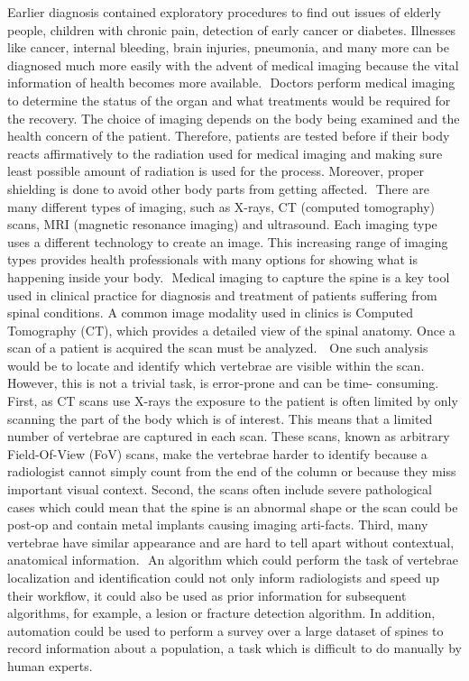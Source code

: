 Earlier diagnosis contained exploratory procedures to find out issues of elderly people, children with chronic pain, detection of early cancer or diabetes. Illnesses like cancer, internal bleeding, brain injuries, pneumonia, and many more can be diagnosed much more easily with the advent of medical imaging because the vital information of health becomes more available.  Doctors perform medical imaging to determine the status of the organ and what treatments would be required for the recovery. The choice of imaging depends on the body being examined and the health concern of the patient. Therefore, patients are tested before if their body reacts affirmatively to the radiation used for medical imaging and making sure least possible amount of radiation is used for the process. Moreover, proper shielding is done to avoid other body parts from getting affected.  There are many different types of imaging, such as X-rays, CT (computed tomography) scans, MRI (magnetic resonance imaging) and ultrasound. Each imaging type uses a different technology to create an image. This increasing range of imaging types provides health professionals with many options for showing what is happening inside your body.  Medical imaging to capture the spine is a key tool used in clinical practice for diagnosis and treatment of patients suffering from spinal conditions. A common image modality used in clinics is Computed Tomography (CT), which provides a detailed view of the spinal anatomy. Once a scan of a patient is acquired the scan must be analyzed.   One such analysis would be to locate and identify which vertebrae are visible within the scan. However, this is not a trivial task, is error-prone and can be time- consuming. First, as CT scans use X-rays the exposure to the patient is often limited by only scanning the part of the body which is of interest. This means that a limited number of vertebrae are captured in each scan. These scans, known as arbitrary Field-Of-View (FoV) scans, make the vertebrae harder to identify because a radiologist cannot simply count from the end of the column or because they miss important visual context. Second, the scans often include severe pathological cases which could mean that the spine is an abnormal shape or the scan could be post-op and contain metal implants causing imaging arti-facts. Third, many vertebrae have similar appearance and are hard to tell apart without contextual, anatomical information.  An algorithm which could perform the task of vertebrae localization and identification could not only inform radiologists and speed up their workflow, it could also be used as prior information for subsequent algorithms, for example, a lesion or fracture detection algorithm. In addition, automation could be used to perform a survey over a large dataset of spines to record information about a population, a task which is difficult to do manually by human experts.
